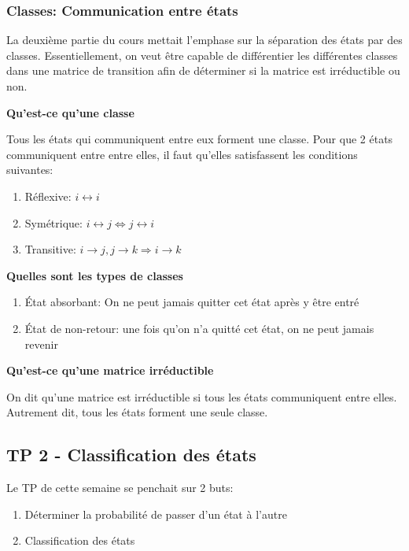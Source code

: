 \documentclass{article}
\begin{document}
\subsubsection{Classes: Communication entre états}

La deuxième partie du cours mettait l'emphase sur la séparation des
états par des classes. Essentiellement, on veut être capable de
différentier les différentes classes dans une matrice de transition
afin de déterminer si la matrice est irréductible ou non.

\textbf{Qu'est-ce qu'une classe}

Tous les états qui communiquent entre eux forment une classe. Pour que
2 états communiquent entre entre elles, il faut qu'elles satisfassent
les conditions suivantes:
\begin{enumerate}
    \item Réflexive: $ i \leftrightarrow i$
    \item Symétrique: $ i \leftrightarrow j \Longleftrightarrow j
	\leftrightarrow i $
    \item Transitive: $ i \to j, j \to k \Longrightarrow i \to k $
\end{enumerate}

\textbf{Quelles sont les types de classes}

\begin{enumerate}
    \item État absorbant: On ne peut jamais quitter cet état après y
	être entré
    \item État de non-retour: une fois qu'on n'a quitté cet état,
	on ne peut jamais revenir
\end{enumerate}

\textbf{Qu'est-ce qu'une matrice irréductible}

On dit qu'une matrice est irréductible si tous les états communiquent
entre elles. Autrement dit, tous les états forment une seule classe.

\subsection{TP 2 - Classification des états}

Le TP de cette semaine se penchait sur 2 buts:
\begin{enumerate}
    \item Déterminer la probabilité de passer d'un état à l'autre
    \item Classification des états
\end{enumerate}
\end{document}
